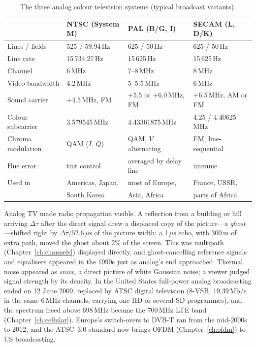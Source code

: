 \begin{table}[htbp]\centering\small
\caption{The three analog colour television systems (typical broadcast variants).}
\label{tab:ch04:tvstd}
\begin{tabular}{@{}llll@{}}
\toprule
 & NTSC (System M) & PAL (B/G, I) & SECAM (L, D/K) \\
\midrule
Lines / fields & 525 / 59.94\,Hz & 625 / 50\,Hz & 625 / 50\,Hz \\
Line rate & 15\,734.27\,Hz & 15\,625\,Hz & 15\,625\,Hz \\
Channel & 6\,MHz & 7--8\,MHz & 8\,MHz \\
Video bandwidth & 4.2\,MHz & 5--5.5\,MHz & 6\,MHz \\
Sound carrier & $+4.5$\,MHz, FM & $+5.5$ or $+6.0$\,MHz, FM & $+6.5$\,MHz, AM or FM \\
Colour subcarrier & 3.579545\,MHz & 4.43361875\,MHz & 4.25 / 4.40625\,MHz \\
Chroma modulation & QAM ($I$, $Q$) & QAM, $V$ alternating & FM, line-sequential \\
Hue error & tint control & averaged by delay line & immune \\
Used in & Americas, Japan, & most of Europe, & France, USSR, \\
 & South Korea & Asia, Africa & parts of Africa \\
\bottomrule
\end{tabular}
\end{table}

\begin{inpractice}[title=Ghosts, snow and the 2009 transition]
Analog TV made radio propagation visible. A reflection from a building or hill arriving $\Delta\tau$ after the
direct signal drew a displaced copy of the picture---a \emph{ghost}---shifted right by
$\Delta\tau/52.6\,\mu\text{s}$ of the picture width: a 1\,$\mu$s echo, with 300\,m of extra path, moved the
ghost about 2\% of the screen. This was multipath (Chapter~\ref{ch:channels}) displayed directly, and
ghost-cancelling reference signals and equalisers appeared in the 1990s just as analog's end approached.
Thermal noise appeared as \emph{snow}, a direct picture of white Gaussian noise; a viewer judged signal
strength by its density. In the United States full-power analog broadcasting ended on 12 June 2009, replaced
by ATSC digital television (8-VSB, 19.39\,Mb/s in the same 6\,MHz channels, carrying one HD or several SD
programmes), and the spectrum freed above 698\,MHz became the 700\,MHz LTE band (Chapter~\ref{ch:cellular}).
Europe's switch-overs to DVB-T ran from the mid-2000s to 2012, and the ATSC~3.0 standard now brings OFDM
(Chapter~\ref{ch:ofdm}) to US broadcasting.
\end{inpractice}

